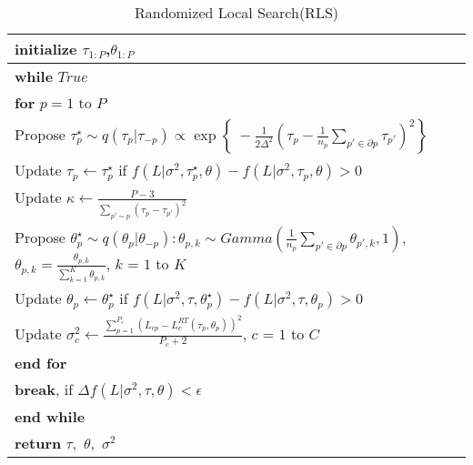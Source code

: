 \begin{table}[h!]
    \caption{Randomized Local Search(RLS)}
    \label{tab:randomized_local_search}
    \centering
    \begin{tabular}{ p{\linewidth} }
        \hline
        \hline
        \textbf{initialize} $\tau_{1:P}$,$\theta_{1:P}$ \\
        \hline
        \textbf{while} $True$ \\
        \hspace{4pt}\textbf{for} $p=1$ to $P$ \\
        \hspace{8pt}Propose $\tau^\star_p \sim q(\tau_p|\tau_{-p}) \propto \exp\left\{\ -\frac{1}{2\Delta^2}\left( \tau_p - \frac{1}{n_p}\sum\limits_{p\prime\in \partial p}\tau_{p\prime}   \right)^2\right\}$\\
        \hspace{8pt}Update $\tau_p \leftarrow \tau^\star_p$ if $f(L|\sigma^2,\tau^\star_p,\theta) - f(L|\sigma^2,\tau_p,\theta) > 0$\\
        \hspace{8pt}Update $\kappa \leftarrow \frac{P-3}{\sum\limits_{p\prime \sim p} (\tau_p-\tau_{p\prime})^2}$\\
        \hspace{8pt}Propose $\theta^\star_p \sim q(\theta_p|\theta_{-p}): \theta_{p,k} \sim Gamma\left( \frac{1}{n_p}\sum\limits_{p\prime\in \partial p} \theta_{p\prime,k},1\right)$,$\theta_{p,k} = \frac{\theta_{p,k}}{\sum\limits_{k=1}^K \theta_{p,k}}$, $k$ = $1$ to $K$\\
        \hspace{8pt}Update $\theta_p \leftarrow \theta^\star_p$ if $f(L|\sigma^2,\tau,\theta^\star_p) - f(L|\sigma^2,\tau,\theta_p) > 0$\\
        \hspace{8pt}Update $\sigma_c^2 \leftarrow \frac{\sum\limits_{p=1}^{P_c}\left(L_{cp}-L_c^{RT}(\tau_p,\theta_p)\right)^2}{P_c+2}$, $c$ = $1$ to $C$\\
        \hspace{4pt}\textbf{end for} \\
        \hspace{4pt}\textbf{break}, if $\Delta f(L|\sigma^2,\tau,\theta) < \epsilon$\\
        \textbf{end while}\\
        \hline
        \textbf{return} $\tau$,\ $\theta$,\ $\sigma^2$\\
        \hline
        \hline
    \end{tabular}
\end{table}

